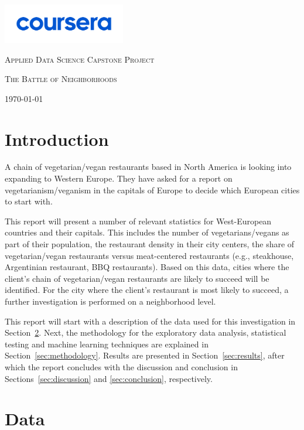\documentclass[12pt,a4paper]{article}
\begin{document}
\begin{titlepage}
	\centering
	\includegraphics[width=0.4\textwidth]{courseraLogo}\par\vspace{3cm}
	{\scshape\large Applied Data Science Capstone Project \par}
	\vspace{1cm}
	{\scshape\LARGE The Battle of Neighborhoods\par}
	\vfill
	{\large \today\par}
\end{titlepage}
\section{Introduction}
A chain of vegetarian/vegan restaurants based in North America is looking into expanding to Western Europe. They have asked for a report on vegetarianism/veganism in the capitals of Europe to decide which European cities to start with. 

This report will present a number of relevant statistics for West-European countries and their capitals. This includes the number of vegetarians/vegans as part of their population, the restaurant density in their city centers, the share of vegetarian/vegan restaurants versus meat-centered restaurants (e.g., steakhouse, Argentinian restaurant, BBQ restaurants). Based on this data, cities where the client's chain of vegetarian/vegan restaurants are likely to succeed will be identified. For the city where the client's restaurant is most likely to succeed, a further investigation is performed on a neighborhood level. 

This report will start with a description of the data used for this investigation in Section~\ref{sec:data}. Next, the methodology for the exploratory data analysis, statistical testing and machine learning techniques are explained in Section~\ref{sec:methodology}. Results are presented in Section~\ref{sec:results}, after which the report concludes with the discussion and conclusion in Sections~\ref{sec:discussion} and \ref{sec:conclusion}, respectively.

\section{Data}
\label{sec:data}
\end{document}
